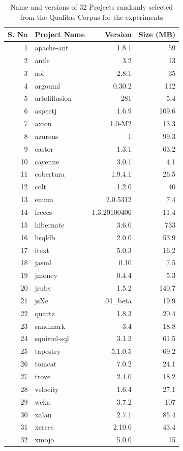 \documentclass{acm_proc_article-sp}
\begin{document}
\begin{table}[h]
\caption{Name and versions of 32 Projects randomly selected from the Qualitas Corpus for the experiments}
\centering
\begin{tabular}{|r|l|r|r|}
\hline
S. No& 	Project Name	& 	Version		&	Size (MB)\\
\hline
1	&	apache-ant	&	1.8.1			&	59\\
2	&	antlr			&	3.2			&	13\\
3	&	aoi			&	2.8.1			&	35\\
4	&	argouml		&	0.30.2		&	112\\
5	&	artofillusion	&	281			&	5.4\\
6	&	aspectj		&	1.6.9			&	109.6\\
7	&	axion		&	1.0-M2		&	13.3\\
8	&	azureus		&	1			&	99.3\\
9	&	castor		&	1.3.1			&	63.2\\
10	&	cayenne		&	3.0.1			&	4.1\\
11	&	cobertura		&	1.9.4.1		&	26.5\\
12	&	colt			&	1.2.0			&	40\\
13	&	emma		&	2.0.5312		&	7.4\\
14	&	freecs		&	1.3.20100406	&	11.4\\
15	&	hibernate		&	3.6.0			&	733\\
16	&	hsqldb		&	2.0.0			&	53.9\\
17	&	itext			&	5.0.3			&	16.2\\
18	&	jasml		&	0.10			&	7.5 \\
19	&	jmoney		&	0.4.4			&	5.3\\
20	&	jruby			&	1.5.2			&	140.7\\
21	&	jsXe			&	04\_beta		&	19.9\\
22	&	quartz		&	1.8.3			&	20.4\\
23	&	sandmark		&	3.4			&	18.8\\
24	&	squirrel-sql	&	3.1.2			&	61.5\\
25	&	tapestry		&	5.1.0.5		&	69.2\\
26	&	tomcat		&	7.0.2			&	24.1\\
27	&	trove			&	2.1.0			&	18.2\\
28	&	velocity		&	1.6.4			&	27.1\\
29	&	weka		&	3.7.2			&	107\\
30	&	xalan		&	2.7.1			&	85.4\\
31	&	xerces		&	2.10.0		&	43.4\\
32	&	xmojo		&	5.0.0			&	15\\
\hline
\end{tabular}
\bigskip
\label{table:projects}
\end{table}
\end{document}
